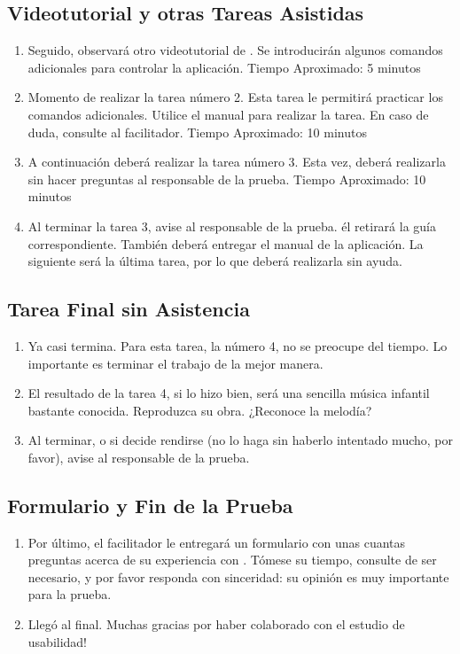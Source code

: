\subsection{Videotutorial y otras Tareas Asistidas}

\begin{enumerate}
    \setcounter{enumi}{\theenumTemp}
    \item Seguido, observar\'a otro videotutorial de . Se introducir\'an algunos comandos adicionales para controlar la aplicaci\'on. Tiempo Aproximado: 5 minutos
    \item Momento de realizar la tarea n\'umero 2. Esta tarea le permitir\'a practicar los comandos adicionales. Utilice el manual para realizar la tarea. En caso de duda, consulte al facilitador.
    Tiempo Aproximado: 10 minutos
    \item A continuaci\'on deber\'a realizar la tarea n\'umero 3. Esta vez, deber\'a realizarla sin hacer preguntas al responsable de la prueba.
    Tiempo Aproximado: 10 minutos
    \item Al terminar la tarea 3, avise al responsable de la prueba. \'el retirar\'a la gu\'ia correspondiente. Tambi\'en deber\'a entregar el manual de la aplicaci\'on. La siguiente ser\'a la \'ultima tarea, por lo que deber\'a realizarla sin ayuda.
    \setcounter{enumTemp}{\theenumi}
\end{enumerate}

\subsection{Tarea Final sin Asistencia}

\begin{enumerate}
    \setcounter{enumi}{\theenumTemp}
    \item Ya casi termina. Para esta tarea, la n\'umero 4, no se preocupe del tiempo. Lo importante es terminar el trabajo de la mejor manera. 
    \item El resultado de la tarea 4, si lo hizo bien, ser\'a una sencilla m\'usica infantil bastante conocida. Reproduzca su obra. ¿Reconoce la melod\'ia?
    \item Al terminar, o si decide rendirse (no lo haga sin haberlo intentado mucho, por favor), avise al responsable de la prueba.
    \setcounter{enumTemp}{\theenumi}
\end{enumerate}

\subsection{Formulario y Fin de la Prueba}

\begin{enumerate}
    \setcounter{enumi}{\theenumTemp}
    \item Por \'ultimo, el facilitador le entregar\'a un formulario con unas cuantas preguntas acerca de su experiencia con . T\'omese su tiempo, consulte de ser necesario, y por favor responda con sinceridad: su opini\'on es muy importante para la prueba.
    \item Lleg\'o al final. Muchas gracias por haber colaborado con el estudio de usabilidad! 
\end{enumerate}

